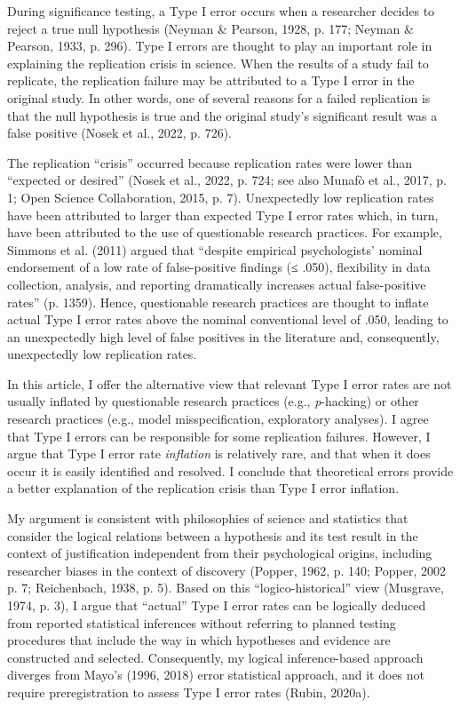 \documentclass[authordate, empirical]{jote-new-article}
\begin{document}
	During significance testing, a Type I error occurs when a researcher decides to reject a true null hypothesis (Neyman \& Pearson, 1928, p. 177; Neyman \& Pearson, 1933, p. 296). Type I errors are thought to play an important role in explaining the replication crisis in science. When the results of a study fail to replicate, the replication failure may be attributed to a Type I error in the original study. In other words, one of several reasons for a failed replication is that the null hypothesis is true and the original study's significant result was a false positive (Nosek et al., 2022, p. 726).



	The replication “crisis” occurred because replication rates were lower than “expected or desired” (Nosek et al., 2022, p. 724; see also Munafò et al., 2017, p. 1; Open Science Collaboration, 2015, p. 7). Unexpectedly low replication rates have been attributed to larger than expected Type I error rates which, in turn, have been attributed to the use of questionable research practices. For example, Simmons et al. (2011) argued that “despite empirical psychologists' nominal endorsement of a low rate of false-positive findings (≤ .050), flexibility in data collection, analysis, and reporting dramatically increases actual false-positive rates” (p. 1359). Hence, questionable research practices are thought to inflate actual Type I error rates above the nominal conventional level of .050, leading to an unexpectedly high level of false positives in the literature and, consequently, unexpectedly low replication rates.



	In this article, I offer the alternative view that relevant Type I error rates are not usually inflated by questionable research practices (e.g., \emph{p}-hacking) or other research practices (e.g., model misspecification, exploratory analyses). I agree that Type I errors can be responsible for some replication failures. However, I argue that Type I error rate \emph{inflation} is relatively rare, and that when it does occur it is easily identified and resolved. I conclude that theoretical errors provide a better explanation of the replication crisis than Type I error inflation.



	My argument is consistent with philosophies of science and statistics that consider the logical relations between a hypothesis and its test result in the context of justification independent from their psychological origins, including researcher biases in the context of discovery (Popper, 1962, p. 140; Popper, 2002 p. 7; Reichenbach, 1938, p. 5). Based on this “logico-historical” view (Musgrave, 1974, p. 3), I argue that “actual” Type I error rates can be logically deduced from reported statistical inferences without referring to planned testing procedures that include the way in which hypotheses and evidence are constructed and selected. Consequently, my logical inference-based approach diverges from Mayo's (1996, 2018) error statistical approach, and it does not require preregistration to assess Type I error rates (Rubin, 2020a).
\end{document}
